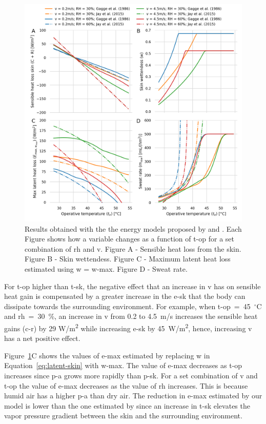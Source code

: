\begin{figure}[thb!]
    \centering
    \includegraphics[width=\textwidth]{figures/comparison_models_v2.png}
    \caption{Results obtained with the the energy models proposed by  and .
    Each Figure shows how a variable changes as a function of \ac{t-op} for a set combination of \ac{rh} and \ac{v}.
    Figure A - Sensible heat loss from the skin.
    Figure B - Skin wettendess.
    Figure C - Maximum latent heat loss estimated using \ac{w} = \ac{w-max}.
    Figure D - Sweat rate.}
    \label{fig:comparison_models}
\end{figure}

For \ac{t-op} higher than \ac{t-sk}, the negative effect that an increase in \ac{v} has on sensible heat gain is compensated by a greater increase in the \acf{e-sk} that the body can dissipate towards the surrounding environment.
For example, when \ac{t-op}~=~45~$^{\circ}$C and \ac{rh}~=~30~\%, an increase in \ac{v} from 0.2 to 4.5~m/s increases the sensible heat gains (\acs{c-r}) by 29 W/m\textsuperscript{2} while increasing \ac{e-sk} by 45~W/m\textsuperscript{2}, hence, increasing \ac{v} has a net positive effect.

Figure~\ref{fig:comparison_models}C shows the values of \ac{e-max} estimated by replacing \ac{w} in Equation~\ref{eq:latent-skin} with \ac{w-max}.
The value of \ac{e-max} decreases as \ac{t-op} increases since \ac{p-a} grows more rapidly than \ac{p-sk}.
For a set combination of \ac{v} and \ac{t-op} the value of \ac{e-max} decreases as the value of \ac{rh} increases.
This is because humid air has a higher \ac{p-a} than dry air.
The reduction in \ac{e-max} estimated by our model is lower than the one estimated by  since an increase in \ac{t-sk} elevates the vapor pressure gradient between the skin and the surrounding environment.

